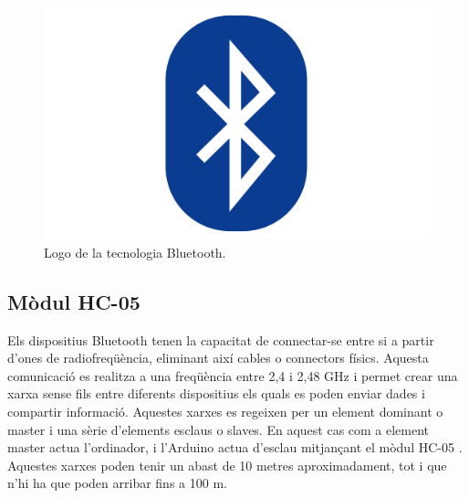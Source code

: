 \begin{figure}[H]
	\centering
	\includegraphics[scale=0.03]{BluetoothLogo}
	\caption{Logo de la tecnologia Bluetooth.}
	\label{fig:BTlogo}
\end{figure}

\subsection{Mòdul HC-05}

Els dispositius Bluetooth tenen la capacitat de connectar-se entre si a partir d’ones de radiofreqüència, eliminant així cables o connectors físics. Aquesta comunicació es realitza a una freqüència entre 2,4 i 2,48 GHz i permet crear una xarxa sense fils entre diferents dispositius els quals es poden enviar dades i compartir informació. Aquestes xarxes es regeixen per un element dominant o master i una sèrie d’elements esclaus o slaves. En aquest cas com a  element master actua l’ordinador, i l’Arduino actua d’esclau mitjançant el mòdul HC-05 \cite{HC05Bib}. Aquestes xarxes poden tenir un abast de 10 metres aproximadament, tot i que n’hi ha que poden arribar fins a 100 m. 

